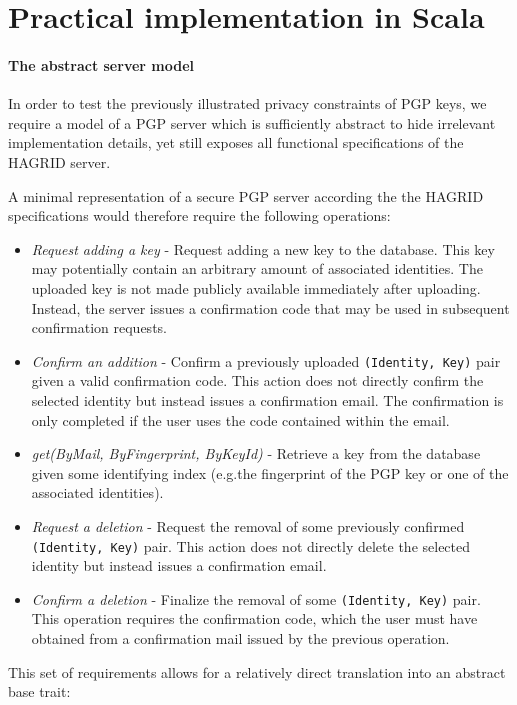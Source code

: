 
\section{Practical implementation in Scala}
\label{sec:abstract_model}
\paragraph{The abstract server model}
In order to test the previously illustrated privacy constraints of PGP keys, we require a model of a PGP server which is sufficiently abstract to hide irrelevant implementation details, yet still exposes all functional specifications of the HAGRID server.

A minimal representation of a secure PGP server according the the HAGRID specifications would therefore require the following operations:
\begin{itemize}
    \item \emph{Request adding a key} - Request adding a new key to the database. This key may potentially contain an arbitrary amount of associated identities. The uploaded key is not made publicly available immediately after uploading. Instead, the server issues a confirmation code that may be used in subsequent confirmation requests.
    \item \emph{Confirm an addition} - Confirm a previously uploaded \texttt{(Identity, Key)} pair given a valid confirmation code. This action does not directly confirm the selected identity but instead issues a confirmation email. The confirmation is only completed if the user uses the code contained within the email.
    \item \emph{get(ByMail, ByFingerprint, ByKeyId)} - Retrieve a key from the database given some identifying index (e.g.the fingerprint of the PGP key or one of the associated identities).
    \item \emph{Request a deletion} - Request the removal of some previously confirmed \texttt{(Identity, Key)} pair. This action does not directly delete the selected identity but instead issues a confirmation email.
    \item \emph{Confirm a deletion} - Finalize the removal of some \texttt{(Identity, Key)} pair. This operation requires the confirmation code, which the user must have obtained from a confirmation mail issued by the previous operation.
\end{itemize}
This set of requirements allows for a relatively direct translation into an abstract base trait: 
